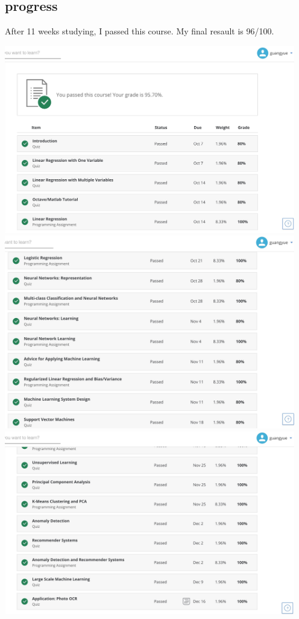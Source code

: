 \documentclass[a4paper]{article}
\begin{document}
\subsection{progress}
After 11 weeks studying, I passed this course. My final resault is 96/100.
\begin{center}
\includegraphics[width=5in]{res1.png}
\includegraphics[width=5in]{res2.png}
\includegraphics[width=5in]{res3.png}
\end{center}
\end{document}
